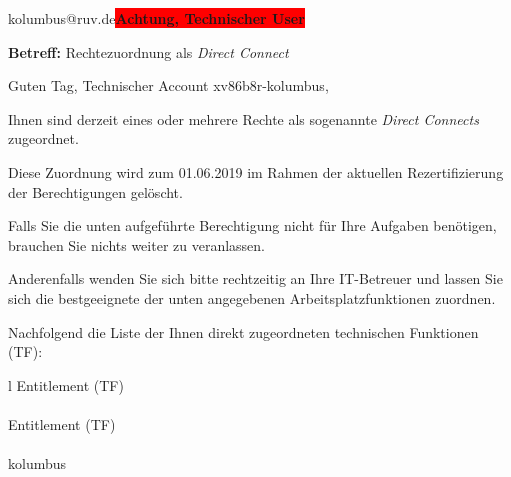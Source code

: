 \documentclass[a4paper,landscape,12pt]{letter}
\begin{document}
\begin{letter}{kolumbus@ruv.de\space\space\space\space\space\space\space\space\space\bfseries\colorbox{red}{Achtung, Technischer User}\hfill \break}
\begin{normalsize}
	\opening{\textbf{Betreff:} Rechtezuordnung als \emph{Direct Connect}}
	\begin{normalsize} \hfill
	\end{normalsize}

	\begin{normalsize}
		Guten Tag, 
	Technischer Account xv86b8r-kolumbus, \hfill \break
	\end{normalsize}
	\end{normalsize}
	
\begin{normalsize}
	Ihnen sind derzeit eines oder mehrere Rechte als sogenannte \emph{Direct Connects} zugeordnet.
	
	Diese Zuordnung wird zum 01.06.2019 im Rahmen der aktuellen Rezertifizierung der Berechtigungen gelöscht.
	
	Falls Sie die unten aufgeführte Berechtigung nicht für Ihre Aufgaben benötigen, 
	brauchen Sie nichts weiter zu veranlassen.
	
	Anderenfalls wenden Sie sich bitte rechtzeitig an Ihre IT-Betreuer 
	und lassen Sie sich die bestgeeignete der unten angegebenen Arbeitsplatzfunktionen zuordnen.
	\end{normalsize}
	
\begin{normalsize}
	Nachfolgend die Liste der Ihnen direkt zugeordneten technischen Funktionen (TF):

	\begin{longtable}{l}
		Entitlement (TF) \\ \hline
		\endfirsthead
		\\\hline
		Entitlement (TF) \\ \hline
		\endhead %
		\multicolumn{1}{r@{}}{Fortsetzung \ldots}\\
		\endfoot
		\hline
		\endlastfoot
	kolumbus\\
	\end{longtable}
	\end{normalsize}
	

\end{letter}
\end{document}
